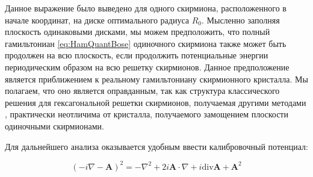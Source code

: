 \documentclass[a4paper,article,14pt]{extarticle}
\begin{document}
Данное выражение было выведено для одного скирмиона, расположенного в начале координат, на диске оптимального радиуса $R_0$. Мысленно заполняя плоскость одинаковыми дисками, мы можем предположить, что полный гамильтониан \eqref{eq:HamQuantBose} одиночного скирмиона также может быть продолжен на всю плоскость, если продолжить потенциальные энергии периодическим образом на всю решетку скирмионов. Данное предположение является приближением к реальному гамильтониану скирмионного кристалла. Мы полагаем, что оно является оправданным, так как структура классического решения для гексагональной решетки скирмионов, получаемая другими методами \cite{Mochizuki2012}, практически неотличима от кристалла, получаемого замощением плоскости одиночными скирмионами.

Для дальнейшего анализа оказывается удобным ввести калибровочный потенциал:

\begin{equation}
(- i \nabla - \mathbf{A} ) ^ 2 = - \nabla ^ 2 + 2 i \mathbf{A} \cdot \nabla + i \text{div} \mathbf{A}  + \mathbf{A}^2
\end{equation}
\end{document}

